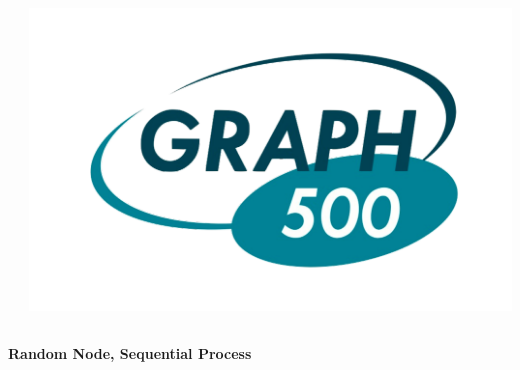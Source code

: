 \documentclass[final]{beamer}
\begin{document}
\begin{frame}[t]
\begin{columns}[t]
\begin{column}{0.60\paperwidth}
\begin{columns}[t,totalwidth=0.60\paperwidth]
\begin{column}{0.28\paperwidth}
\begin{columns}[t,totalwidth=0.28\paperwidth]
\begin{column}{0.12\paperwidth}
							\end{column}
							\begin{column}{0.12\paperwidth}
								\begin{center} \includegraphics[width=0.12\paperwidth]{img/logo_graph500} \end{center}
							\end{column}
						\end{columns}
					\end{column}
				\end{columns}
				\begin{columns}[t,totalwidth=0.60\paperwidth]
					\begin{column}{0.28\paperwidth}
						\begin{center} \bf{Random Node, Sequential Process} \end{center}
						\begin{columns}[t,totalwidth=0.28\paperwidth]
							\begin{column}{0.12\paperwidth}

\end{column}
\end{columns}
\end{column}
\end{columns}
\end{column}
\end{columns}
\end{frame}
\end{document}
